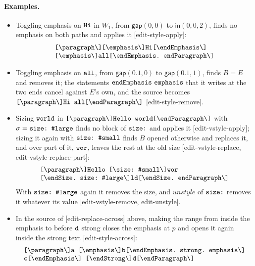 \documentclass[11pt]{article}
\numberwithin{equation}{section}
\newcommand{\kw}[1]{\ensuremath{\mathsf{#1}}}
\newcommand{\str}[1]{\ensuremath{\text{\texttt{#1}}}}
\newcommand{\bs}{\textbackslash}
\begin{document}
\paragraph{Examples.}
\begin{itemize}
\item Toggling emphasis on $\str{Hi}$ in $W_1$, from $\kw{gap}(0, 0)$ to
      $\kw{in}(0, 0, 2)$, finds no emphasis on both paths and applies it
      [edit-style-apply]:
      \[
      \begin{array}{@{}l@{}}
      \str{[\bs{}paragraph\bs][\bs{}emphasis\bs]Hi[\bs{}endEmphasis\bs]\ } \\
      \str{[\bs{}emphasis\bs]all[\bs{}endEmphasis.\ endParagraph\bs]}
      \end{array}
      \]
\item Toggling emphasis on $\str{all}$, from $\kw{gap}(0.1, 0)$ to
      $\kw{gap}(0.1, 1)$, finds $B = E$ and removes it; the statements
      $\str{endEmphasis}\ \str{emphasis}$ that it writes at the two ends
      cancel against $E$'s own, and the source becomes
      $\str{[\bs{}paragraph\bs]Hi\ all[\bs{}endParagraph\bs]}$
      [edit-style-remove].
\item Sizing $\str{world}$ in
      $\str{[\bs{}paragraph\bs]Hello\ world[\bs{}endParagraph\bs]}$ with
      $\sigma = \str{size:\ \#large}$ finds no block of $\str{size:}$ and
      applies it [edit-vstyle-apply]; sizing it again with
      $\str{size:\ \#small}$ finds $B$ opened otherwise and replaces it, and
      over part of it, $\str{wor}$, leaves the rest at the old size
      [edit-vstyle-replace, edit-vstyle-replace-part]:
      \[
      \begin{array}{@{}l@{}}
      \str{[\bs{}paragraph\bs]Hello\ [\bs{}size:\ \#small\bs]wor} \\
      \str{[\bs{}endSize.\ size:\ \#large\bs]ld[\bs{}endSize.\ endParagraph\bs]}
      \end{array}
      \]
      With $\str{size:\ \#large}$ again it removes the size, and
      $\mathit{unstyle}$ of $\str{size:}$ removes it whatever its value
      [edit-vstyle-remove, edit-unstyle].
\item In the source of [edit-replace-across] above, making the range from inside the
      emphasis to before $\str{d}$ strong closes the emphasis at $p$ and
      opens it again inside the strong text [edit-style-across]:
      \[
      \begin{array}{@{}l@{}}
      \str{[\bs{}paragraph\bs]a\ [\bs{}emphasis\bs]b[\bs{}endEmphasis.\ strong.\ emphasis\bs]} \\
      \str{c[\bs{}endEmphasis\bs]\ [\bs{}endStrong\bs]d[\bs{}endParagraph\bs]}
      \end{array}
      \]
\end{itemize}
\end{document}
